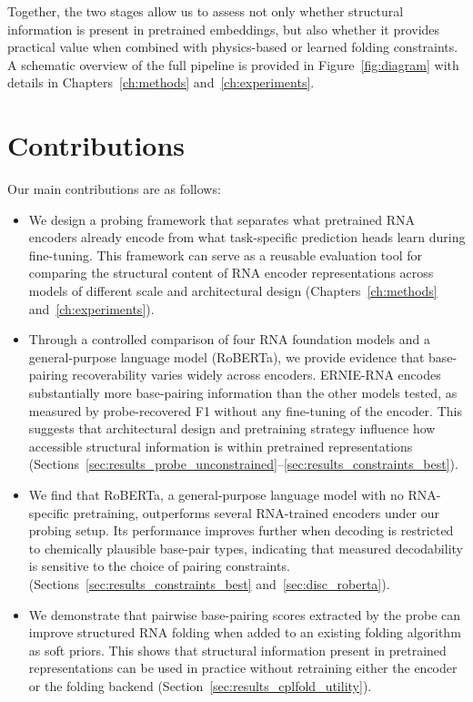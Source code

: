 \documentclass[logo,bsc,singlespacing,parskip]{infthesis}
\begin{document}
Together, the two stages allow us to assess not only whether structural information is present in pretrained embeddings, but also whether it provides practical value when combined with physics-based or learned folding constraints. A schematic overview of the full pipeline is provided in Figure~\ref{fig:diagram} with details in Chapters~\ref{ch:methods} and~\ref{ch:experiments}.

\section{Contributions}
\label{sec:intro_contrib}
Our main contributions are as follows:
\begin{itemize}

\item We design a probing framework that separates what
pretrained RNA encoders already encode from what task-specific
prediction heads learn during fine-tuning. This framework can
serve as a reusable evaluation tool for comparing the
structural content of RNA encoder representations across models
of different scale and architectural design
(Chapters~\ref{ch:methods} and~\ref{ch:experiments}).

\item Through a controlled comparison of four RNA foundation models and a general-purpose language model (RoBERTa), we provide evidence that base-pairing recoverability varies widely across encoders. ERNIE-RNA encodes substantially more base-pairing information than the other models tested, as measured by probe-recovered F1 without any fine-tuning of the encoder. This suggests that architectural design and pretraining strategy influence how accessible structural information is within pretrained representations
(Sections~\ref{sec:results_probe_unconstrained}--\ref{sec:results_constraints_best}).

\item We find that RoBERTa, a general-purpose language model with no RNA-specific pretraining, outperforms several RNA-trained encoders under our probing setup. Its performance improves further when decoding is restricted to chemically plausible base-pair types, indicating that measured decodability is sensitive to the choice of pairing constraints.
(Sections~\ref{sec:results_constraints_best}
and~\ref{sec:disc_roberta}).

\item We demonstrate that pairwise base-pairing scores extracted by the probe can improve structured RNA folding when added to an existing folding algorithm as soft priors. This shows that structural information present in pretrained representations can be used in practice without retraining either the encoder or the folding backend
(Section~\ref{sec:results_cplfold_utility}).

\end{itemize}
\end{document}
